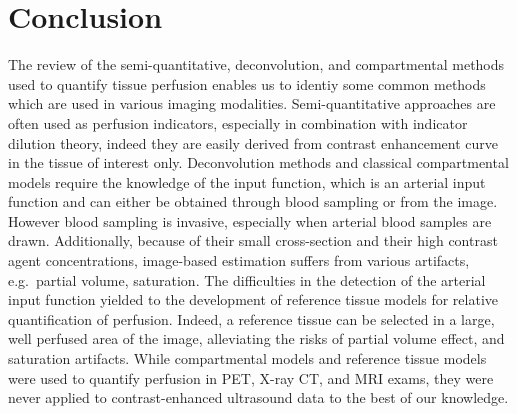 \chapter{Conclusion}\label{chapter:conclusion}
The review of the semi-quantitative, deconvolution, and compartmental methods used to quantify tissue perfusion enables us to identiy some common methods which are used in various imaging modalities.
Semi-quantitative approaches are often used as perfusion indicators, especially in combination with indicator dilution theory, indeed they are easily derived from contrast enhancement curve in the tissue of interest only.
Deconvolution methods and classical compartmental models require the knowledge of the input function, which is an arterial input function and can either be obtained through blood sampling or from the image.
However blood sampling is invasive, especially when arterial blood samples are drawn. 
Additionally, because of their small cross-section and their high contrast agent concentrations, image-based estimation suffers from various artifacts, e.g.~partial volume, saturation.
The difficulties in the detection of the arterial input function yielded to the development of reference tissue models for relative quantification of perfusion.
Indeed, a reference tissue can be selected in a large, well perfused area of the image, alleviating the risks of partial volume effect, and saturation artifacts.
While compartmental models and reference tissue models were used to quantify perfusion in PET, X-ray CT, and MRI exams, they were never applied to contrast-enhanced ultrasound data to the best of our knowledge.

